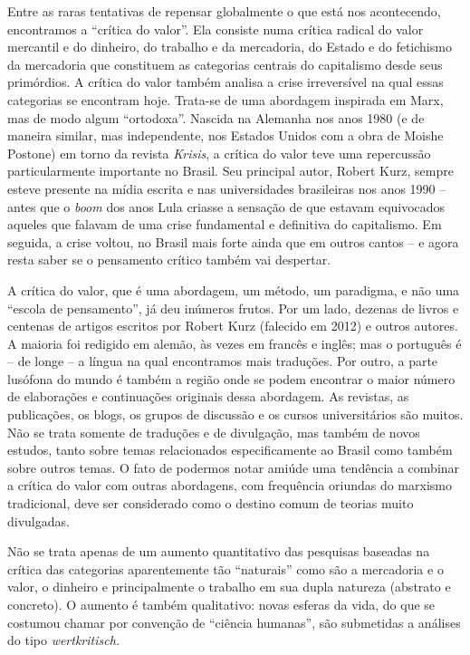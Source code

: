 Entre as raras tentativas de repensar globalmente o que está nos
acontecendo, encontramos a ``crítica do valor''. Ela consiste numa
crítica radical do valor mercantil e do dinheiro, do trabalho e da
mercadoria, do Estado e do fetichismo da mercadoria que constituem as
categorias centrais do capitalismo desde seus primórdios. A crítica do
valor também analisa a crise irreversível na qual essas categorias se
encontram hoje. Trata-se de uma abordagem inspirada em Marx, mas de modo
algum ``ortodoxa''. Nascida na Alemanha nos anos 1980 (e de maneira
similar, mas independente, nos Estados Unidos com a obra de Moishe
Postone) em torno da revista \emph{Krisis}, a crítica do valor teve uma
repercussão particularmente importante no Brasil. Seu principal autor,
Robert Kurz, sempre esteve presente na mídia escrita e nas universidades
brasileiras nos anos 1990 -- antes que o \emph{boom} dos anos Lula
criasse a sensação de que estavam equivocados aqueles que falavam de uma
crise fundamental e definitiva do capitalismo. Em seguida, a crise
voltou, no Brasil mais forte ainda que em outros cantos -- e agora resta
saber se o pensamento crítico também vai despertar.

A crítica do valor, que é uma abordagem, um método, um paradigma, e não
uma ``escola de pensamento'', já deu inúmeros frutos. Por um lado,
dezenas de livros e centenas de artigos escritos por Robert Kurz
(falecido em 2012) e outros autores. A maioria foi redigido em alemão,
às vezes em francês e inglês; mas o português é -- de longe -- a língua
na qual encontramos mais traduções. Por outro, a parte lusófona do mundo
é também a região onde se podem encontrar o maior número de elaborações
e continuações originais dessa abordagem. As revistas, as publicações,
os blogs, os grupos de discussão e os cursos universitários são muitos.
Não se trata somente de traduções e de divulgação, mas também de novos
estudos, tanto sobre temas relacionados especificamente ao Brasil como
também sobre outros temas. O fato de podermos notar amiúde uma tendência
a combinar a crítica do valor com outras abordagens, com frequência
oriundas do marxismo tradicional, deve ser considerado como o destino
comum de teorias muito divulgadas.

Não se trata apenas de um aumento quantitativo das pesquisas baseadas na
crítica das categorias aparentemente tão ``naturais'' como são a
mercadoria e o valor, o dinheiro e principalmente o trabalho em sua
dupla natureza (abstrato e concreto). O aumento é também qualitativo:
novas esferas da vida, do que se costumou chamar por convenção de
``ciência humanas'', são submetidas a análises do tipo
\emph{wertkritisch.}


